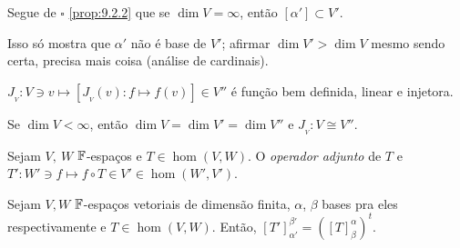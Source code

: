 \begin{corollary}
    Segue de \(\square\) \ref{prop:9.2.2} que se \(\dim V = \infty \), então \([\alpha'] \subset V'\).  
\end{corollary}

\begin{note}
    Isso só mostra que \(\alpha'\) não é base de \(V'\); afirmar \(\dim V' > \dim V\) mesmo sendo certa, precisa mais coisa (análise de cardinais).   
\end{note}

\propositionnum{}
\begin{lemma}
    \(J_{_V}:V \ni v \mapsto [J_{_V}(v): f \mapsto f(v)] \in V''\) é função bem definida, linear e injetora. %
\end{lemma}


\begin{corollary}
    Se \(\dim V < \infty\), então \(\dim V = \dim V' = \dim V''\) e \(J_{_V}: V \cong V''\). 
\end{corollary}

\begin{lemma}
    Sejam \(V, \ W\) \(\mathbb{F}\)-espaços e \(T\in \hom(V,W)\). O \emph{operador adjunto} de \(T\) e \(T': W' \ni f \mapsto f \circ T \in V' \in \hom(W',V')\).  
\end{lemma}

\begin{proposition}
    \label{prop:9.2.3}
    Sejam \(V, W\) \(\mathbb{F}\)-espaços vetoriais de dimensão finita, \(\alpha\), \(\beta \) bases pra eles respectivamente e \(T\in \hom(V,W)\). Então, \([T']^{\beta'}_{\alpha'} = ([T]^\alpha_\beta)^t\). 
\end{proposition}



